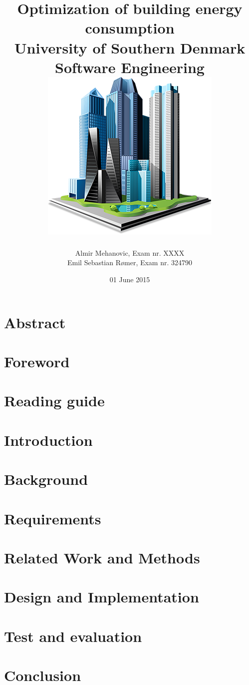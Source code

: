 \documentclass[35pt]{report}
\title{
	{Optimization of building energy consumption}\\
	{\large University of Southern Denmark \\Software Engineering }\\
	{\includegraphics{frontpage.png}}
}
\author{Almir Mehanovic, Exam nr. XXXX\\Emil Sebastian Rømer, Exam nr. 324790}
\date{01 June 2015}
\begin{document}
\maketitle

\chapter*{Abstract}


\chapter*{Foreword}


\tableofcontents

\chapter*{Reading guide}


\chapter{Introduction}


\chapter{Background}


\chapter{Requirements}


\chapter{Related Work and Methods}


\chapter{Design and Implementation}


\chapter{Test and evaluation}

\chapter{Conclusion}



\end{document}
